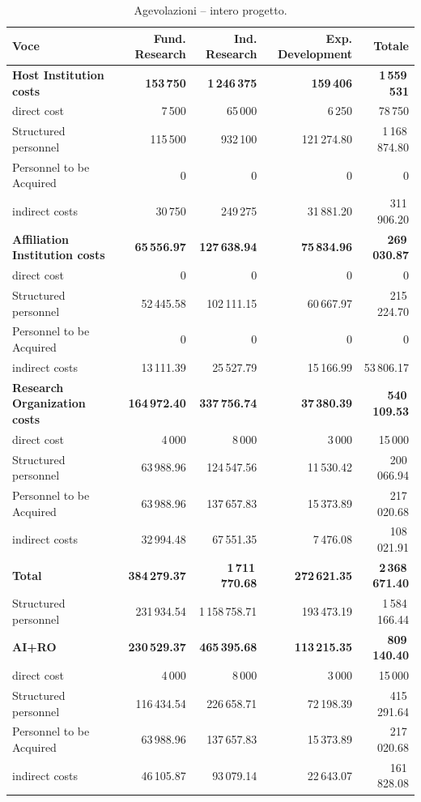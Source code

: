 \documentclass{plan4ari_report}
\begin{document}
\begin{table}[H]\centering\small
\caption{Agevolazioni -- intero progetto.}\label{tab:bpy-a-tot}
\begin{tabular}{lrrrr}\toprule
\textbf{Voce} & \textbf{Fund. Research} & \textbf{Ind. Research} & \textbf{Exp. Development} & \textbf{Totale} \\\midrule
\textbf{Host Institution costs} & \textbf{153\,750} & \textbf{1\,246\,375} & \textbf{159\,406} & \textbf{1\,559\,531} \\
\quad direct cost & 7\,500 & 65\,000 & 6\,250 & 78\,750 \\
\quad Structured personnel & 115\,500 & 932\,100 & 121\,274.80 & 1\,168\,874.80 \\
\quad Personnel to be Acquired & 0 & 0 & 0 & 0 \\
\quad indirect costs & 30\,750 & 249\,275 & 31\,881.20 & 311\,906.20 \\
\textbf{Affiliation Institution costs} & \textbf{65\,556.97} & \textbf{127\,638.94} & \textbf{75\,834.96} & \textbf{269\,030.87} \\
\quad direct cost & 0 & 0 & 0 & 0 \\
\quad Structured personnel & 52\,445.58 & 102\,111.15 & 60\,667.97 & 215\,224.70 \\
\quad Personnel to be Acquired & 0 & 0 & 0 & 0 \\
\quad indirect costs & 13\,111.39 & 25\,527.79 & 15\,166.99 & 53\,806.17 \\
\textbf{Research Organization costs} & \textbf{164\,972.40} & \textbf{337\,756.74} & \textbf{37\,380.39} & \textbf{540\,109.53} \\
\quad direct cost & 4\,000 & 8\,000 & 3\,000 & 15\,000 \\
\quad Structured personnel & 63\,988.96 & 124\,547.56 & 11\,530.42 & 200\,066.94 \\
\quad Personnel to be Acquired & 63\,988.96 & 137\,657.83 & 15\,373.89 & 217\,020.68 \\
\quad indirect costs & 32\,994.48 & 67\,551.35 & 7\,476.08 & 108\,021.91 \\
\midrule
\textbf{Total} & \textbf{384\,279.37} & \textbf{1\,711\,770.68} & \textbf{272\,621.35} & \textbf{2\,368\,671.40} \\
\quad Structured personnel & 231\,934.54 & 1\,158\,758.71 & 193\,473.19 & 1\,584\,166.44 \\
\textbf{AI+RO} & \textbf{230\,529.37} & \textbf{465\,395.68} & \textbf{113\,215.35} & \textbf{809\,140.40} \\
\quad direct cost & 4\,000 & 8\,000 & 3\,000 & 15\,000 \\
\quad Structured personnel & 116\,434.54 & 226\,658.71 & 72\,198.39 & 415\,291.64 \\
\quad Personnel to be Acquired & 63\,988.96 & 137\,657.83 & 15\,373.89 & 217\,020.68 \\
\quad indirect costs & 46\,105.87 & 93\,079.14 & 22\,643.07 & 161\,828.08 \\
\bottomrule\end{tabular}
\end{table}
\end{document}
